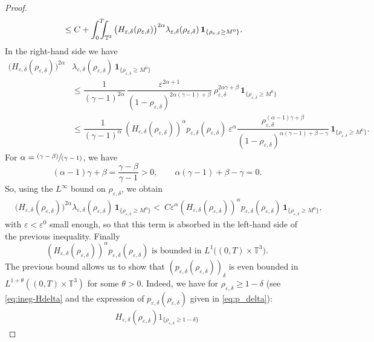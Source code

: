 \documentclass[10pt]{amsart}
\newcommand{\<}{\bigl\langle}
\renewcommand{\>}{\bigr\rangle}
\newcommand{\pspfrac}[2]{\sfrac{(#1)}{(#2)}}
\newcommand{\intTTT}{\int_0^T\hspace*{-2.5mm}\int_{\TT}}
\newcommand{\labeleq}[1]{}
\theoremstyle{definition}
\theoremstyle{remark}
\newcommand{\TT}{\mathbb{T}^3}
\let\ep\varepsilon
\begin{document}
\begin{proof}
\begin{align*}
& \leq C + \intTTT{\big(H_{\ep,\delta}(\rho_{\ep,\delta}) \big)^{2\alpha}\lambda_{\ep,\delta}(\rho_{\ep,\delta}) \,\mathbf{1}_{\{ \rho_{\ep,\delta} \geq M^0 \}} }.
\end{align*}
In the right-hand side we have
\begin{align*}
\big(H_{\ep,\delta}(\rho_{\ep,\delta})\big)^{2\alpha}&\lambda_{\ep,\delta}(\rho_{\ep,\delta}) \,\mathbf{1}_{\{ \rho_{\ep,\delta} \geq M^0 \}}\\
&\leq \dfrac{1}{(\gamma-1)^{2\alpha}}\,\dfrac{\ep^{2\alpha + 1}}{(1-\rho_{\ep,\delta})^{2\alpha (\gamma-1) + \beta}} \ \rho_{\ep,\delta}^{2\alpha\gamma + \beta}\,\mathbf{1}_{\{ \rho_{\ep,\delta} \geq M^0 \}} \\
& \leq \dfrac{1}{(\gamma-1)^{\alpha}}\,\left(H_{\ep,\delta}(\rho_{\ep,\delta})\right)^{\alpha} p_{\ep,\delta}(\rho_{\ep,\delta}) \ \ep^\alpha \dfrac{\rho_{\ep,\delta}^{(\alpha-1) \gamma + \beta}}{(1-\rho_{\ep,\delta})^{\alpha(\gamma-1)+\beta-\gamma}}\,\mathbf{1}_{\{ \rho_{\ep,\delta} \geq M^0 \}}.
\end{align*}
For $\alpha = \pspfrac{\gamma - \beta}{\gamma-1}$, we have
\[
(\alpha-1)\gamma+\beta = \dfrac{\gamma-\beta}{\gamma-1} > 0,
\qquad \alpha(\gamma-1)+\beta-\gamma = 0.
\]
So, using the $L^\infty$ bound on $\rho_{\ep,\delta}$, we obtain
\begin{align*}
&\big(H_{\ep,\delta}(\rho_{\ep,\delta})\big)^{2\alpha}\lambda_{\ep,\delta}(\rho_{\ep,\delta}) \,\mathbf{1}_{\{ \rho_{\ep,\delta} \geq M^0 \}}
< \ C\ep^\alpha \left(H_{\ep,\delta}(\rho_{\ep,\delta})\right)^{\alpha} p_{\ep,\delta}(\rho_{\ep,\delta}) \,\mathbf{1}_{\{ \rho_{\ep,\delta} \geq M^0 \}},
\end{align*}
with $\ep< \ep^0$ small enough, so that this term is absorbed in the left-hand side of the previous inequality.
Finally
\begin{equation*}\labeleq{add_control_p_delta}
\left(H_{\ep,\delta}(\rho_{\ep,\delta})\right)^{\alpha} p_{\ep,\delta}(\rho_{\ep,\delta}) \text{ is bounded in } L^1\big((0,T)\times \TT\big).
\end{equation*} 
The previous bound allows us to show that $(p_{\ep,\delta}(\rho_{\ep,\delta}))_\delta$ is even bounded in $L^{1+\theta}((0,T)\times \TT)$ for some $\theta > 0$.
Indeed, we have for $\rho_{\varepsilon,\delta} \ge 1-\delta$ (see \eqref{eq:ineg-Hdelta}
and the expression of $p_{\varepsilon,\delta}(\rho_{\varepsilon,\delta})$ given in \eqref{eq:p_delta}):
\begin{align*}
H_{\varepsilon,\delta}(\rho_{\varepsilon,\delta}) 1_{\{\rho_{\varepsilon,\delta} \geq 1-\delta\}}

\end{align*}
\end{proof}
\end{document}
